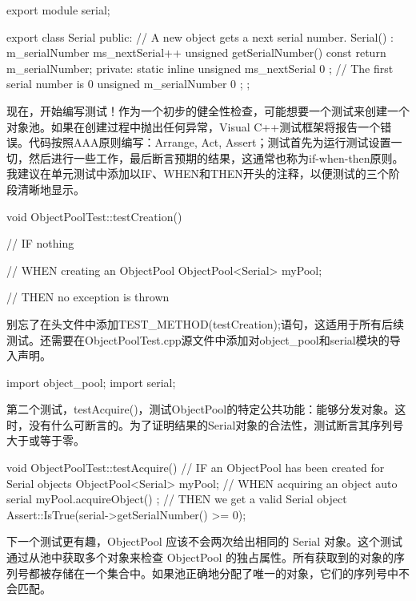 \begin{cpp}
export module serial;

export class Serial
{
    public:
        // A new object gets a next serial number.
        Serial() : m_serialNumber { ms_nextSerial++ } { }
        unsigned getSerialNumber() const { return m_serialNumber; }
    private:
        static inline unsigned ms_nextSerial { 0 }; // The first serial number is 0
        unsigned m_serialNumber { 0 };
};
\end{cpp}

现在，开始编写测试！作为一个初步的健全性检查，可能想要一个测试来创建一个对象池。如果在创建过程中抛出任何异常，Visual C++测试框架将报告一个错误。代码按照AAA原则编写：Arrange, Act, Assert；测试首先为运行测试设置一切，然后进行一些工作，最后断言预期的结果，这通常也称为if-when-then原则。我建议在单元测试中添加以IF、WHEN和THEN开头的注释，以便测试的三个阶段清晰地显示。

\begin{cpp}
void ObjectPoolTest::testCreation()
{
    // IF nothing

    // WHEN creating an ObjectPool
    ObjectPool<Serial> myPool;

    // THEN no exception is thrown
}
\end{cpp}

别忘了在头文件中添加TEST\_METHOD(testCreation);语句，这适用于所有后续测试。还需要在ObjectPoolTest.cpp源文件中添加对object\_pool和serial模块的导入声明。

\begin{cpp}
import object_pool;
import serial;
\end{cpp}

第二个测试，testAcquire()，测试ObjectPool的特定公共功能：能够分发对象。这时，没有什么可断言的。为了证明结果的Serial对象的合法性，测试断言其序列号大于或等于零。

\begin{cpp}
void ObjectPoolTest::testAcquire()
{
    // IF an ObjectPool has been created for Serial objects
    ObjectPool<Serial> myPool;
    // WHEN acquiring an object
    auto serial { myPool.acquireObject() };
    // THEN we get a valid Serial object
    Assert::IsTrue(serial->getSerialNumber() >= 0);
}
\end{cpp}

下一个测试更有趣，ObjectPool 应该不会两次给出相同的 Serial 对象。这个测试通过从池中获取多个对象来检查 ObjectPool 的独占属性。所有获取到的对象的序列号都被存储在一个集合中。如果池正确地分配了唯一的对象，它们的序列号中不会匹配。

